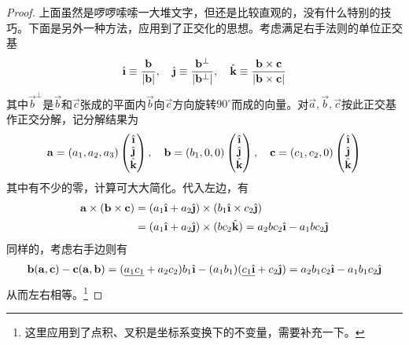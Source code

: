\begin{proof}
  上面虽然是啰啰嗦嗦一大堆文字，但还是比较直观的，没有什么特别的技巧。下面是另外一种方法，应用到了正交化的思想。考虑满足右手法则的单位正交基
  \begin{align*}
    \ihat \equiv \frac{\vec b}{\left|\vec b\right|},\quad
    \jhat \equiv \frac{\vec b^\perp}{\left|\vec b^\perp\right|},\quad
    \khat \equiv \frac{\vec b\times \vec c}{\left|\vec b\times\vec c\right|}
  \end{align*}
  其中$\vec b^\perp$是$\vec b$和$\vec c$张成的平面内$\vec b$向$\vec c$方向旋转$90^\circ$而成的向量。对$\vec a,\vec b,\vec c$按此正交基作正交分解，记分解结果为
  \begin{align*}\renewcommand{\arraystretch}{.9}
    \vec a=(a_1, a_2, a_3)\begin{pmatrix}\ihat\\ \jhat\\ \khat\end{pmatrix}, \quad
    \vec b=(b_1,   0,   0)\begin{pmatrix}\ihat\\ \jhat\\ \khat\end{pmatrix}, \quad
    \vec c=(c_1, c_2,   0)\begin{pmatrix}\ihat\\ \jhat\\ \khat\end{pmatrix}
  \end{align*}
  其中有不少的零，计算可大大简化。代入左边，有
  \begin{align*}
    \vec a\times(\vec b\times\vec c) ={}& (a_1\ihat + a_2\jhat)\times(b_1\ihat \times c_2\jhat)\\
    ={}& (a_1\ihat + a_2\jhat)\times(bc_2\khat) = a_2bc_2\ihat - a_1bc_2\jhat
  \end{align*}
  同样的，考虑右手边则有
  \begin{align*}
    \vec b(\vec a,\vec c) - \vec c(\vec a,\vec b) = (\underline{a_1c_1} + a_2c_2) b_1\ihat  - (a_1b_1)(\underline{c_1\ihat} + c_2\jhat)
    =a_2b_1c_2\ihat - a_1b_1c_2\jhat
  \end{align*}
  从而左右相等。\footnote{这里应用到了点积、叉积是坐标系变换下的不变量，需要补充一下。}
\end{proof}

